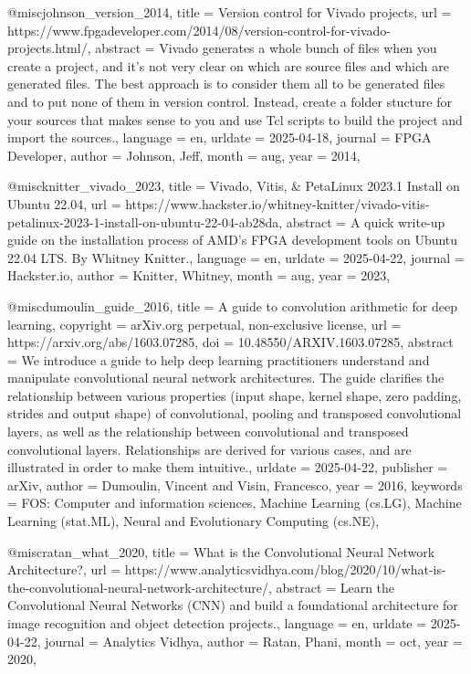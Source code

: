 
@misc{johnson_version_2014,
	title = {Version control for {Vivado} projects},
	url = {https://www.fpgadeveloper.com/2014/08/version-control-for-vivado-projects.html/},
	abstract = {Vivado generates a whole bunch of files when you create a project, and it’s not very clear on which are source files and which are generated files. The best approach is to consider them all to be generated files and to put none of them in version control. Instead, create a folder stucture for your sources that makes sense to you and use Tcl scripts to build the project and import the sources.},
	language = {en},
	urldate = {2025-04-18},
	journal = {FPGA Developer},
	author = {Johnson, Jeff},
	month = aug,
	year = {2014},
}

@misc{knitter_vivado_2023,
	title = {Vivado, {Vitis}, \& {PetaLinux} 2023.1 {Install} on {Ubuntu} 22.04},
	url = {https://www.hackster.io/whitney-knitter/vivado-vitis-petalinux-2023-1-install-on-ubuntu-22-04-ab28da},
	abstract = {A quick write-up guide on the installation process of AMD's FPGA development tools on Ubuntu 22.04 LTS. By Whitney Knitter.},
	language = {en},
	urldate = {2025-04-22},
	journal = {Hackster.io},
	author = {Knitter, Whitney},
	month = aug,
	year = {2023},
}

@misc{dumoulin_guide_2016,
	title = {A guide to convolution arithmetic for deep learning},
	copyright = {arXiv.org perpetual, non-exclusive license},
	url = {https://arxiv.org/abs/1603.07285},
	doi = {10.48550/ARXIV.1603.07285},
	abstract = {We introduce a guide to help deep learning practitioners understand and manipulate convolutional neural network architectures. The guide clarifies the relationship between various properties (input shape, kernel shape, zero padding, strides and output shape) of convolutional, pooling and transposed convolutional layers, as well as the relationship between convolutional and transposed convolutional layers. Relationships are derived for various cases, and are illustrated in order to make them intuitive.},
	urldate = {2025-04-22},
	publisher = {arXiv},
	author = {Dumoulin, Vincent and Visin, Francesco},
	year = {2016},
	keywords = {FOS: Computer and information sciences, Machine Learning (cs.LG), Machine Learning (stat.ML), Neural and Evolutionary Computing (cs.NE)},
}

@misc{ratan_what_2020,
	title = {What is the {Convolutional} {Neural} {Network} {Architecture}?},
	url = {https://www.analyticsvidhya.com/blog/2020/10/what-is-the-convolutional-neural-network-architecture/},
	abstract = {Learn the Convolutional Neural Networks (CNN) and build a foundational architecture for image recognition and object detection projects.},
	language = {en},
	urldate = {2025-04-22},
	journal = {Analytics Vidhya},
	author = {Ratan, Phani},
	month = oct,
	year = {2020},
}

